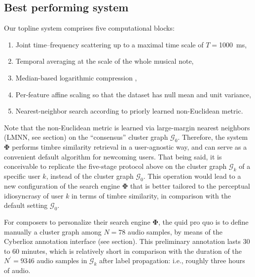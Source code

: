 \documentclass{bmcart}
\newcommand{\lnameref}[1]{%
\bgroup
\let\nmu\MakeLowercase
\nameref{#1}\egroup}
\newcommand{\nmu}{}
\begin{document}
\subsection*{Best performing system}
Our topline system comprises five computational blocks:
\begin{enumerate}
\item Joint time--frequency scattering up to a maximal time scale of $T=$\SI{1000}{\milli\second},
\item Temporal averaging at the scale of the whole musical note,
\item Median-based logarithmic compression \cite[Equation 1]{lostanlen2018extended},
\item Per-feature affine scaling so that the dataset has null mean and unit variance,
\item Nearest-neighbor search according to priorly learned non-Euclidean metric.
\end{enumerate}
Note that the non-Euclidean metric is learned via large-margin nearest neighbors (LMNN, see \lnameref{sec:methods} section) on the ``consensus'' cluster graph $\mathcal{G}_0$.
Therefore, the system $\mathbf{\Phi}$ performs timbre similarity retrieval in a user-agnostic way, and can serve as a convenient default algorithm for newcoming users.
That being said, it is conceivable to replicate the five-stage protocol above on the cluster graph $\mathcal{G}_k$ of a specific user $k$, instead of the cluster graph $\mathcal{G}_0$.
This operation would lead to a new configuration of the search engine $\mathbf{\Phi}$ that is better tailored to the perceptual idiosyncrasy of user $k$ in terms of timbre similarity, in comparison with the default setting $\mathcal{G}_0$.

For composers to personalize their search engine $\mathbf{\Phi}$, the quid pro quo is to define manually a cluster graph among $N=78$ audio samples, by means of the Cyberlioz annotation interface (see \lnameref{sec:survey} section).
This preliminary annotation lasts $30$ to $60$ minutes, which is relatively short in comparison with the duration of the $N^\prime = 9346$ audio samples in $\mathcal{G}_k$ after label propagation: i.e., roughly three hours of audio.
\end{document}
